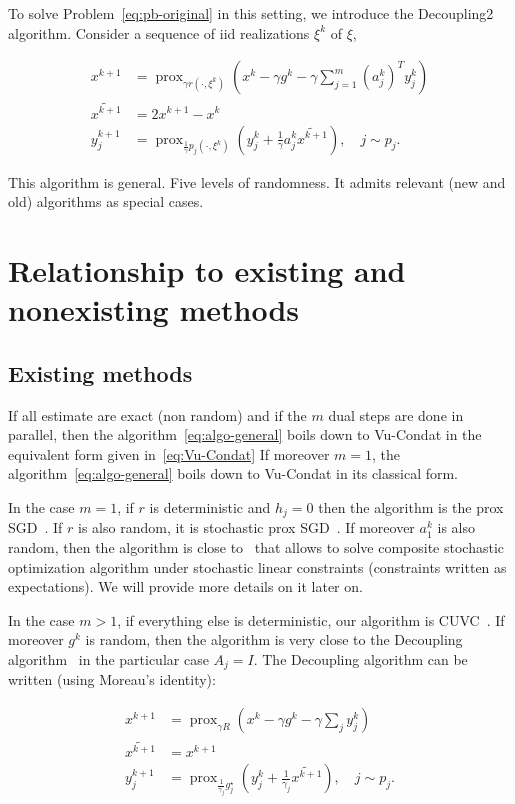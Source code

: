 \documentclass{article}
\DeclareMathOperator{\prox}{prox}
\theoremstyle{definition}
\begin{document}
To solve Problem~\eqref{eq:pb-original} in this setting, we introduce the Decoupling2 algorithm. Consider a sequence of iid realizations $\xi^k$ of $\xi$,


\begin{align}
    \label{eq:algo-general}
    x^{k+1}   &= \prox_{\gamma r(\cdot,\xi^{k})}(x^k - \gamma g^{k} - \gamma \sum_{j=1}^m (a_j^{k})^{T} y_j^k)\\
    \widetilde{x^{k+1}} &= 2x^{k+1} - x^k\\
    y_j^{k+1} &= \prox_{\frac{1}{\gamma} p_j(\cdot,\xi^k)}(y_j^k + \frac{1}{\gamma} a_j^k \widetilde{x^{k+1}}), \quad j \sim p_j.
\end{align}

This algorithm is general. Five levels of randomness. It admits relevant (new and old) algorithms as special cases.

\section{Relationship to existing and nonexisting methods}

\subsection{Existing methods}
If all estimate are exact (non random) and if the $m$ dual steps are done in parallel, then the algorithm~\eqref{eq:algo-general} boils down to Vu-Condat in the equivalent form given in~\eqref{eq:Vu-Condat}
If moreover $m=1$, the algorithm~\eqref{eq:algo-general} boils down to Vu-Condat in its classical form.


In the case $m=1$, if $r$ is deterministic and $h_j = 0$ then the algorithm is the prox SGD~\cite{gorbunov2019unified}. If $r$ is also random, it is stochastic prox SGD~\cite{bia-hac,bia-hac-sal}. If moreover $a_1^k$ is also random, then the algorithm is close to~\cite{salim} that allows to solve composite stochastic optimization algorithm under stochastic linear constraints (constraints written as expectations). We will provide more details on it later on.

In the case $m > 1$, if everything else is deterministic, our algorithm is CUVC~\cite{fercoq,yin,pesquet,iutzeler}. If moreover $g^k$ is random, then the algorithm is very close to the Decoupling algorithm~\cite{mishchenko2019stochastic} in the particular case $A_j = I$. The Decoupling algorithm can be written (using Moreau's identity):


\begin{align}
    x^{k+1}   &= \prox_{\gamma R}(x^k - \gamma g^k - \gamma \sum_j y_j^k)\\
    \widetilde{x^{k+1}} &= x^{k+1}\\
    y_j^{k+1} &= \prox_{\frac{1}{\gamma_j} g_j^\star}(y_j^k + \frac{1}{\gamma_j}\widetilde{x^{k+1}} ), \quad j \sim p_j.
\end{align}
\end{document}

